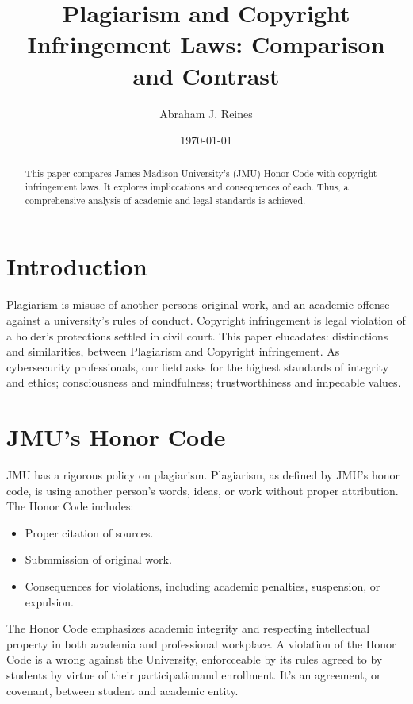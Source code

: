 \documentclass[12pt]{article}
\title{Plagiarism and Copyright Infringement Laws: Comparison and Contrast}
\author{Abraham J. Reines}
\date{\today}
\begin{document}
 
\maketitle
 
\begin{abstract}
This paper compares James Madison University's (JMU) Honor Code with copyright infringement laws. It explores impliccations and consequences of each. Thus, a comprehensive analysis of academic and legal standards is achieved.
\end{abstract}

\section{Introduction}
Plagiarism is misuse of another persons original work, and an academic offense against a university's rules of conduct. Copyright infringement is legal violation of a holder's protections settled in civil court. This paper elucadates:  distinctions and similarities, between Plagiarism and Copyright infringement. As cybersecurity professionals, our field asks for the highest standards of integrity and ethics; consciousness and mindfulness; trustworthiness and impecable values.
 
\section{JMU's Honor Code}
JMU has a rigorous policy on plagiarism. Plagiarism, as defined by JMU's honor code, is using another person's words, ideas, or work without proper attribution. The Honor Code includes:
\begin{itemize}
    \item Proper citation of sources.
    \item Submmission of original work.
    \item Consequences for violations, including academic penalties, suspension, or expulsion.
\end{itemize}
The Honor Code emphasizes academic integrity and respecting intellectual property in both academia and professional workplace. A violation of the Honor Code is a wrong against the University, enforcceable by its rules agreed to by students by virtue of their participationand enrollment. It's an agreement, or covenant, between student and academic entity.
 
\end{document}
